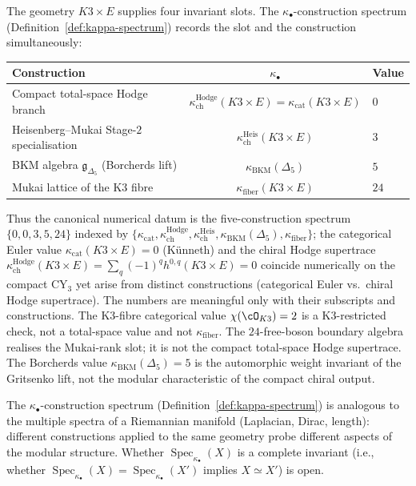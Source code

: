 \begin{example}
\label{ex:kappa-spectrum-k3xe}
The geometry $K3 \times E$ supplies four invariant slots. The
$\kappa_\bullet$-construction spectrum
\textup{(}Definition~\ref{def:kappa-spectrum}\textup{)} records the
slot and the construction simultaneously:
\begin{center}
\small
\begin{tabular}{lcl}
 \toprule
 \textbf{Construction} & $\kappa_\bullet$ & \textbf{Value} \\
 \midrule
 Compact total-space Hodge branch &
 $\kappa_{\mathrm{ch}}^{\mathrm{Hodge}}(K3\times E)=\kappa_{\mathrm{cat}}(K3 \times E)$
 & $0$ \\
 Heisenberg--Mukai Stage-$2$ specialisation &
 $\kappa_{\mathrm{ch}}^{\mathrm{Heis}}(K3 \times E)$
 & $3$ \\
 BKM algebra $\mathfrak{g}_{\Delta_5}$ (Borcherds lift) &
 $\kappa_{\mathrm{BKM}}(\Delta_5)$
 & $5$ \\
 Mukai lattice of the K3 fibre &
 $\kappa_{\mathrm{fiber}}(K3 \times E)$
 & $24$ \\
 \bottomrule
\end{tabular}
\end{center}
Thus the canonical numerical datum is the five-construction
spectrum $\{0,0,3,5,24\}$ indexed by
$\{\kappa_{\mathrm{cat}}, \kappa_{\mathrm{ch}}^{\mathrm{Hodge}},
\kappa_{\mathrm{ch}}^{\mathrm{Heis}}, \kappa_{\mathrm{BKM}}(\Delta_5),
\kappa_{\mathrm{fiber}}\}$; the categorical Euler value
$\kappa_{\mathrm{cat}}(K3 \times E) = 0$ (K\"unneth) and the chiral
Hodge supertrace
$\kappa_{\mathrm{ch}}^{\mathrm{Hodge}}(K3 \times E) =
\sum_q (-1)^q h^{0,q}(K3 \times E) = 0$ coincide numerically on the
compact CY$_3$ yet arise from distinct constructions
(categorical Euler vs.\ chiral Hodge supertrace). The numbers are
meaningful only with their subscripts and constructions.
The K3-fibre categorical value $\chi(\cO_{K3}) = 2$ is a
K3-restricted check, not a total-space value and not
$\kappa_{\mathrm{fiber}}$. The $24$-free-boson boundary algebra
realises the Mukai-rank slot; it is not the compact total-space
Hodge supertrace. The Borcherds value $\kappa_{\mathrm{BKM}}(\Delta_5)=5$ is
the automorphic weight invariant of the Gritsenko lift, not the
modular characteristic of the compact chiral output.
\end{example}

\begin{remark}
\label{rem:kappa-spectrum-k3xe}
The $\kappa_\bullet$-construction spectrum (Definition~\ref{def:kappa-spectrum}) is
analogous to the multiple spectra of a Riemannian
manifold (Laplacian, Dirac, length): different constructions
applied to the same geometry probe different aspects of the modular
structure. Whether $\operatorname{Spec}_{\kappa_\bullet}(X)$ is a complete
invariant (i.e., whether
$\operatorname{Spec}_{\kappa_\bullet}(X) = \operatorname{Spec}_{\kappa_\bullet}(X')$
implies $X \simeq X'$) is open.
\end{remark}

